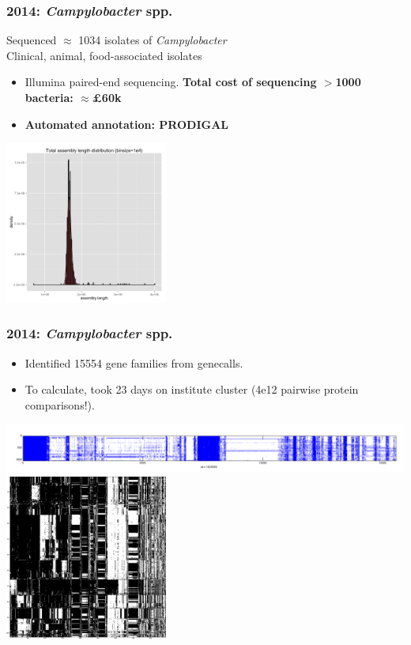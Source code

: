 \begin{frame}
  \frametitle{2014: \textit{Campylobacter} spp.}
  Sequenced $\approx$ 1034 isolates of \textit{Campylobacter} \\
  Clinical, animal, food-associated isolates
  \begin{itemize}
    \item Illumina paired-end sequencing. \textbf{Total cost of sequencing $>$1000 bacteria: $\approx$\pounds60k}
    \item \textbf{Automated annotation: PRODIGAL}    
  \end{itemize}      
  \begin{center}
    \includegraphics[width=0.4\textwidth]{images/Asm_long_contigs_length_histogram}
  \end{center}        
\end{frame}

\begin{frame}
  \frametitle{2014: \textit{Campylobacter} spp.}
  \begin{itemize}
    \item Identified 15554 gene families from genecalls.
    \item To calculate, took 23 days on institute cluster (4e12 pairwise protein comparisons!).  
  \end{itemize}      
  \begin{center}
    \includegraphics[width=1\textwidth]{images/Pres_abs_mat} \\
    \includegraphics[width=0.4\textwidth]{images/campy_presence_absence}    
  \end{center}        
\end{frame}

